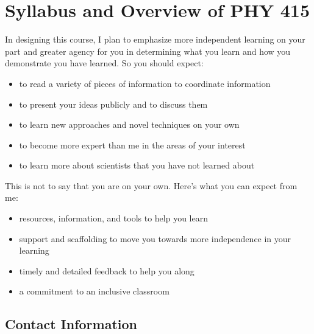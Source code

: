 \documentclass[letterpaper,10pt,english]{jupyterBook}
\begin{document}
\sphinxstepscope


\chapter{Syllabus and Overview of PHY 415}
\label{\detokenize{content/0_course/syllabus:syllabus-and-overview-of-phy-415}}\label{\detokenize{content/0_course/syllabus::doc}}
\sphinxAtStartPar
In designing this course, I plan to emphasize more independent learning on your part and greater agency for you in determining what you learn and how you demonstrate you have learned. So you should expect:
\begin{itemize}
\item {} 
\sphinxAtStartPar
to read a variety of pieces of information to coordinate information

\item {} 
\sphinxAtStartPar
to present your ideas publicly and to discuss them

\item {} 
\sphinxAtStartPar
to learn new approaches and novel techniques on your own

\item {} 
\sphinxAtStartPar
to become more expert than me in the areas of your interest

\item {} 
\sphinxAtStartPar
to learn more about scientists that you have not learned about

\end{itemize}

\sphinxAtStartPar
This is not to say that you are on your own. Here’s what you can expect from me:
\begin{itemize}
\item {} 
\sphinxAtStartPar
resources, information, and tools to help you learn

\item {} 
\sphinxAtStartPar
support and scaffolding to move you towards more independence in your learning

\item {} 
\sphinxAtStartPar
timely and detailed feedback to help you along

\item {} 
\sphinxAtStartPar
a commitment to an inclusive classroom

\end{itemize}


\section{Contact Information}
\label{\detokenize{content/0_course/syllabus:contact-information}}
\end{document}

